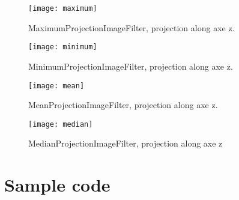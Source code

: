 \documentclass{InsightArticle}
\begin{document}
\begin{figure}[htbp]
\centering
\texttt{[image: maximum]}
\caption{MaximumProjectionImageFilter, projection along axe z.\label{maximum}}
\end{figure}

\begin{figure}[htbp]
\centering
\texttt{[image: minimum]}
\caption{MinimumProjectionImageFilter, projection along axe z.\label{minimum}}
\end{figure}

\begin{figure}[htbp]
\centering
\texttt{[image: mean]}
\caption{MeanProjectionImageFilter, projection along axe z.\label{mean}}
\end{figure}

\begin{figure}[htbp]
\centering
\texttt{[image: median]}
\caption{MedianProjectionImageFilter, projection along axe z\label{median}}
\end{figure}

\section{Sample code}
\end{document}
